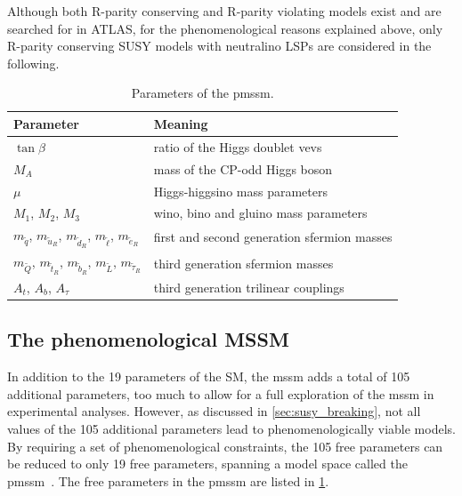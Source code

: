 Although both R-parity conserving and R-parity violating models exist and are searched for in ATLAS, for the phenomenological reasons explained above, only R-parity conserving SUSY models with neutralino LSPs are considered in the following.

\begin{table}
	\centering
	\setlength\heavyrulewidth{0.2ex}
	\small
	\caption{Parameters of the \gls{pmssm}.}
	\begin{tabular} {l l}
	\toprule
		Parameter & Meaning \\ 
	\midrule
	$\tan{\beta}$ & ratio of the Higgs doublet \glspl{vev} \\
	$M_A$ & mass of the CP-odd Higgs boson \\
	$\mu$ & Higgs-higgsino mass parameters \\
	$M_1$, $M_2$, $M_3$ & wino, bino and gluino mass parameters \\
	$m_{\tilde{q}}$, $m_{\tilde{u}_R}$, $m_{\tilde{d}_R}$, $m_{\tilde{\ell}}$, $m_{\tilde{e}_R}$ & first and second generation sfermion masses \\
	$m_{\tilde{Q}}$, $m_{\tilde{t}_R}$, $m_{\tilde{b}_R}$, $m_{\tilde{L}}$, $m_{\tilde{\tau}_R}$ & third generation sfermion masses \\
	$A_t$, $A_b$, $A_\tau$ & third generation trilinear couplings \\
	\bottomrule					
	\end{tabular}\vspace{3mm}
	\label{tab:parameters_pmssm}   
\end{table}

\subsection{The phenomenological MSSM}\label{sec:theory_pmssm}

In addition to the 19 parameters of the SM, the \gls{mssm} adds a total of 105 additional parameters, too much to allow for a full exploration of the \gls{mssm} in experimental analyses. However, as discussed in \cref{sec:susy_breaking}, not all values of the 105 additional parameters lead to phenomenologically viable models. By requiring a set of phenomenological constraints, the 105 free parameters can be reduced to only 19 free parameters, spanning a model space called the \gls{pmssm}~\cite{Djouadi:2002ze,Berger_2009}. The free parameters in the \gls{pmssm} are listed in \cref{tab:parameters_pmssm}.

